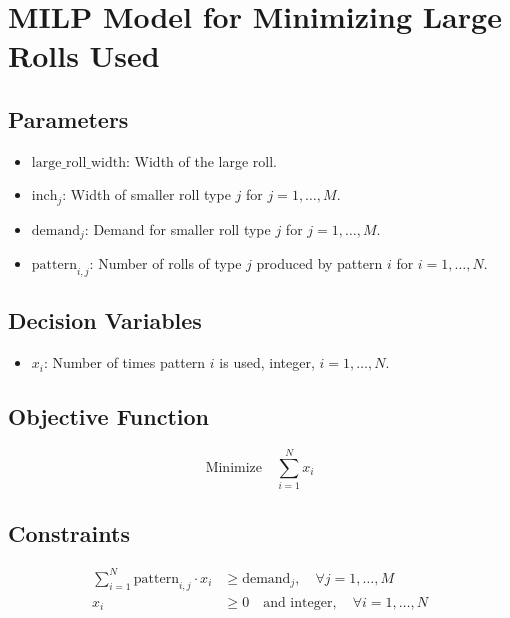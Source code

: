 \documentclass{article}
\begin{document}
\section*{MILP Model for Minimizing Large Rolls Used}

\subsection*{Parameters}
\begin{itemize}
    \item \( \text{large\_roll\_width} \): Width of the large roll.
    \item \( \text{inch}_j \): Width of smaller roll type \( j \) for \( j = 1, \ldots, M \).
    \item \( \text{demand}_j \): Demand for smaller roll type \( j \) for \( j = 1, \ldots, M \).
    \item \( \text{pattern}_{i,j} \): Number of rolls of type \( j \) produced by pattern \( i \) for \( i = 1, \ldots, N \).
\end{itemize}

\subsection*{Decision Variables}
\begin{itemize}
    \item \( x_i \): Number of times pattern \( i \) is used, integer, \( i = 1, \ldots, N \).
\end{itemize}

\subsection*{Objective Function}
\[
\text{Minimize} \quad \sum_{i=1}^{N} x_i
\]

\subsection*{Constraints}
\begin{align*}
    \sum_{i=1}^{N} \text{pattern}_{i,j} \cdot x_i & \geq \text{demand}_j, \quad \forall j = 1, \ldots, M \\
    x_i & \geq 0 \quad \text{and integer}, \quad \forall i = 1, \ldots, N
\end{align*}
\end{document}
